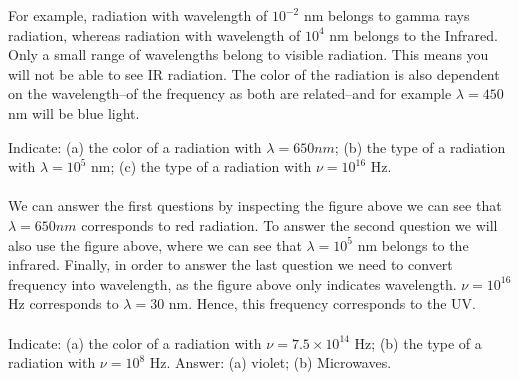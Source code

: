 \documentclass[main.tex]{subfiles}
\begin{document}
\begin{description}
For example, radiation with wavelength of $10^{-2}$ nm belongs to gamma rays radiation, whereas radiation with wavelength of $10^{4}$ nm belongs to the Infrared. Only a small range of wavelengths belong to visible radiation. This means you will not be able to see IR radiation. The color of the radiation is also dependent on the wavelength--of the frequency as both are related--and for example $\lambda=450$ nm will be blue light.
\begin{example} %
Indicate: (a) the color of a radiation with $\lambda=650nm$; (b) the type of a radiation with  $\lambda=10^{5}$ nm; (c) the type of a radiation with  $\nu=10^{16}$ Hz.\\
\\
We can answer the first questions by inspecting the figure above we can see that $\lambda=650nm$ corresponds to red radiation. To answer the second question we will also use the figure above, where we can see that $\lambda=10^{5}$ nm belongs to the infrared. Finally, in order to answer the last question we need to convert frequency into wavelength, as the figure above only indicates wavelength. $\nu=10^{16}$ Hz corresponds to $\lambda=30$ nm. Hence, this frequency corresponds to the UV.
\\
\faDiamond\ \\
Indicate: (a) the color of a radiation with $\nu=7.5\times 10^{14}$ Hz; (b) the type of a radiation with  $\nu=10^{8}$ Hz.
\flushright Answer: (a) violet; (b) Microwaves.
\end{example}%


\end{description}
\end{document}
